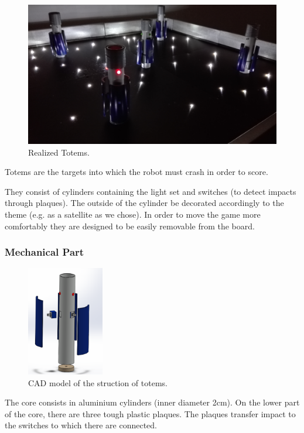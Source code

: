 \documentclass[a4paper,twoside]{book}
\begin{document}
\begin{figure}[h]
\includegraphics[width=\linewidth]{img/IMG_20160616_111854} 
\caption{Realized Totems.}
\end{figure}

Totems are the targets into which the robot must crash in order to score.

They consist of cylinders containing the light set and switches (to detect impacts through plaques). The outside of the cylinder be decorated accordingly to the theme (e.g. as a satellite as we chose). In order to move the game more comfortably they are designed to be easily removable from the board.

\subsubsection{Mechanical Part}

\begin{figure} 
    \centering
    \includegraphics[width=0.3\textwidth]{img/totem_nuovo1}
    \caption{CAD model of the struction of totems.}
\end{figure}

The core consists in aluminium cylinders (inner diameter 2cm). On the lower part of the core, there are three tough plastic plaques. The plaques transfer impact to the switches to which there are connected.
\end{document}

